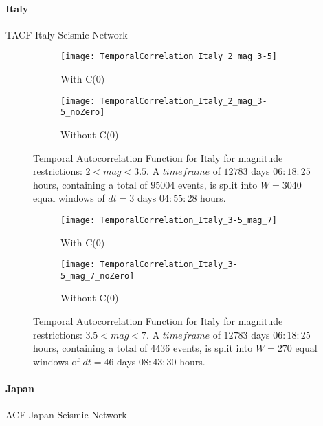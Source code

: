 \clearpage
\paragraph{Italy} TACF Italy Seismic Network

\begin{figure}[!ht]
\begin{subfigure}{.5\textwidth}
  \centering
  \texttt{[image: TemporalCorrelation\_Italy\_2\_mag\_3-5]}
  \caption{With C(0)}
  \label{fig:corrItaly2_3.5}
\end{subfigure}%
\begin{subfigure}{.5\textwidth}
  \centering
  \texttt{[image: TemporalCorrelation\_Italy\_2\_mag\_3-5\_noZero]}
  \caption{Without C(0)}
  \label{fig:corrItaly2_3.5_noZero}
\end{subfigure}
\caption{Temporal Autocorrelation Function for Italy for magnitude restrictions: $2<mag<3.5$. A $timeframe$ of $12783$ days $06:18:25$ hours, containing a total of $95004$ events, is split into $W=3040$ equal windows of $dt=3$ days $04:55:28$ hours.}
\label{fig:corrItaly2_3.5!}
\end{figure}

\begin{figure}[!ht]
\begin{subfigure}{.5\textwidth}
  \centering
  \texttt{[image: TemporalCorrelation\_Italy\_3-5\_mag\_7]}
  \caption{With C(0)}
  \label{fig:corrItaly3.5_7}
\end{subfigure}%
\begin{subfigure}{.5\textwidth}
  \centering
  \texttt{[image: TemporalCorrelation\_Italy\_3-5\_mag\_7\_noZero]}
  \caption{Without C(0)}
  \label{fig:corrItaly3.5_7_noZero}
\end{subfigure}
\caption{Temporal Autocorrelation Function for Italy for magnitude restrictions: $3.5<mag<7$. A $timeframe$ of $12783$ days $06:18:25$ hours, containing a total of $4436$ events, is split into $W=270$ equal windows of $dt=46$ days $08:43:30$ hours.}
\label{fig:corrItaly3.5_7!}
\end{figure}



\clearpage
\paragraph{Japan} ACF Japan Seismic Network

